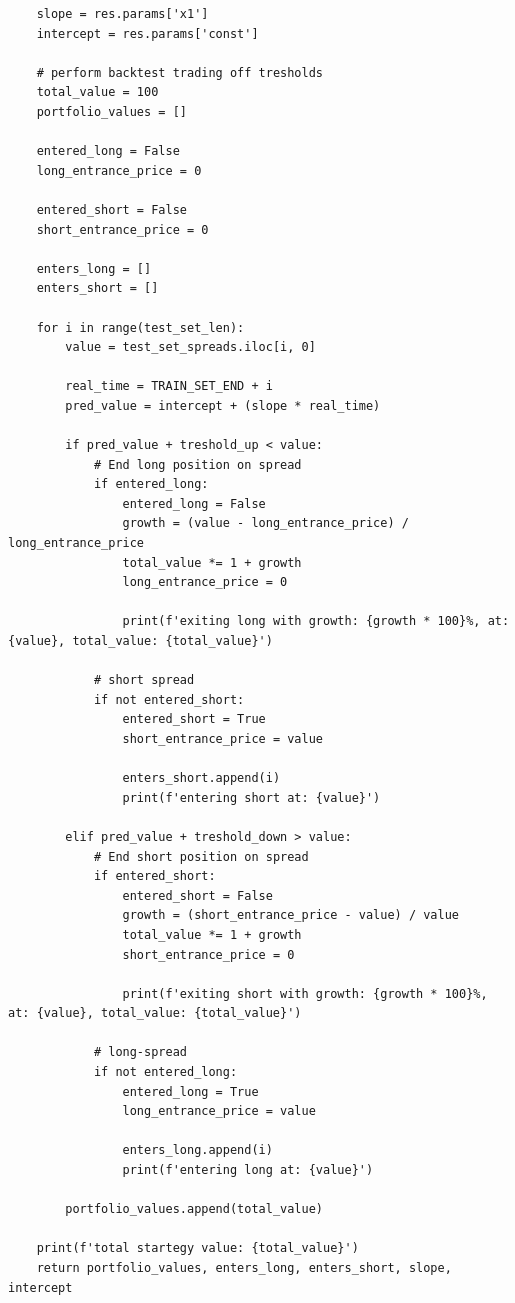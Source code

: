 \documentclass{article}
\begin{document}
\begin{spacing}{2.0}
\begin{lstlisting}
    slope = res.params['x1']
    intercept = res.params['const']

    # perform backtest trading off tresholds
    total_value = 100
    portfolio_values = []

    entered_long = False
    long_entrance_price = 0

    entered_short = False
    short_entrance_price = 0

    enters_long = []
    enters_short = []

    for i in range(test_set_len):
        value = test_set_spreads.iloc[i, 0]

        real_time = TRAIN_SET_END + i
        pred_value = intercept + (slope * real_time)

        if pred_value + treshold_up < value:
            # End long position on spread
            if entered_long:
                entered_long = False
                growth = (value - long_entrance_price) / long_entrance_price
                total_value *= 1 + growth
                long_entrance_price = 0

                print(f'exiting long with growth: {growth * 100}%, at: {value}, total_value: {total_value}')

            # short spread
            if not entered_short:
                entered_short = True
                short_entrance_price = value

                enters_short.append(i)
                print(f'entering short at: {value}')

        elif pred_value + treshold_down > value:
            # End short position on spread
            if entered_short:
                entered_short = False
                growth = (short_entrance_price - value) / value
                total_value *= 1 + growth
                short_entrance_price = 0

                print(f'exiting short with growth: {growth * 100}%, at: {value}, total_value: {total_value}')

            # long-spread
            if not entered_long:
                entered_long = True
                long_entrance_price = value

                enters_long.append(i)
                print(f'entering long at: {value}')

        portfolio_values.append(total_value)

    print(f'total startegy value: {total_value}')
    return portfolio_values, enters_long, enters_short, slope, intercept



\end{lstlisting}
\end{spacing}
\end{document}

